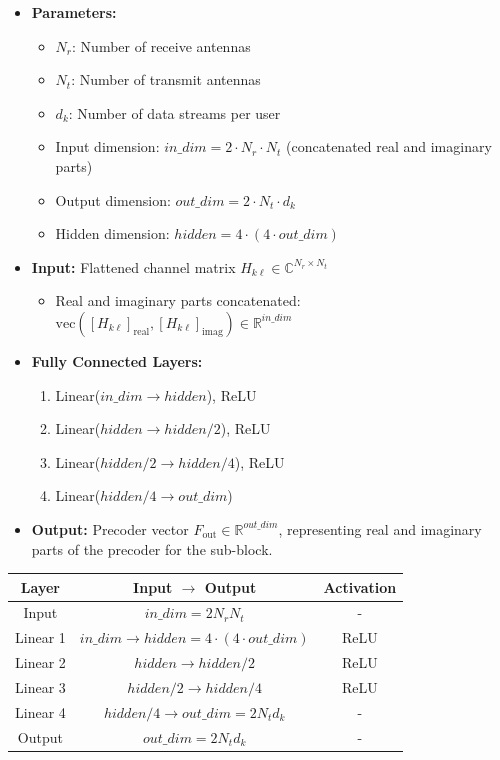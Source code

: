 \documentclass[a4paper, 12pt, onecolumn, journal, twoside, draftclsnofoot]{IEEEtran}
\begin{document}
\begin{itemize}
    \item \textbf{Parameters:}
        \begin{itemize}
            \item $N_r$: Number of receive antennas
            \item $N_t$: Number of transmit antennas
            \item $d_k$: Number of data streams per user
            \item Input dimension: $in\_dim = 2 \cdot N_r \cdot N_t$ (concatenated real and imaginary parts)
            \item Output dimension: $out\_dim = 2 \cdot N_t \cdot d_k$
            \item Hidden dimension: $hidden = 4 \cdot (4 \cdot out\_dim)$
        \end{itemize}

    \item \textbf{Input:} Flattened channel matrix $H_{k\ell} \in \mathbb{C}^{N_r \times N_t}$
        \begin{itemize}
            \item Real and imaginary parts concatenated: $\text{vec}([H_{k\ell}]_\text{real}, [H_{k\ell}]_\text{imag}) \in \mathbb{R}^{in\_dim}$
        \end{itemize}

    \item \textbf{Fully Connected Layers:}
        \begin{enumerate}
            \item Linear($in\_dim \rightarrow hidden$), ReLU
            \item Linear($hidden \rightarrow hidden/2$), ReLU
            \item Linear($hidden/2 \rightarrow hidden/4$), ReLU
            \item Linear($hidden/4 \rightarrow out\_dim$)
        \end{enumerate}
        
    \item \textbf{Output:} Precoder vector $F_\text{out} \in \mathbb{R}^{out\_dim}$, representing real and imaginary parts of the precoder for the sub-block.
\end{itemize}



\begin{tabular}{|c|c|c|}
\hline
Layer & Input $\rightarrow$ Output & Activation \\
\hline
Input & $in\_dim = 2 N_r N_t$ & - \\
Linear 1 & $in\_dim \rightarrow hidden = 4 \cdot (4 \cdot out\_dim)$ & ReLU \\
Linear 2 & $hidden \rightarrow hidden/2$ & ReLU \\
Linear 3 & $hidden/2 \rightarrow hidden/4$ & ReLU \\
Linear 4 & $hidden/4 \rightarrow out\_dim = 2 N_t d_k$ & - \\
\hline
Output & $out\_dim = 2 N_t d_k$ & - \\
\hline
\end{tabular}
\end{document}
